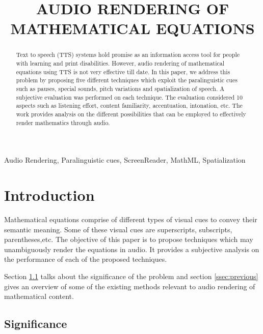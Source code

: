 \documentclass{article}
\title{AUDIO RENDERING OF MATHEMATICAL EQUATIONS}
\begin{document}
%
\maketitle
%
\begin{abstract}

Text to speech (TTS) systems hold promise as an information access tool for people with learning and print disabilities. However, audio rendering of mathematical equations using TTS is not very effective till date. In this paper, we address this problem by proposing five different techniques which exploit the paralinguistic cues such as pauses, special sounds, pitch variations and spatialization of speech. A subjective evaluation was performed on each technique. The evaluation considered 10 aspects such as listening effort, content familiarity, accentuation, intonation, etc. The work provides analysis on the different possibilities that can be employed to effectively render mathematics through audio.


\end{abstract}
%
\begin{keywords}
 Audio Rendering, Paralinguistic cues, ScreenReader, MathML, Spatialization
\end{keywords}
%
\section{Introduction}
\label{sec:intro}
Mathematical equations comprise of different types of visual cues to convey their semantic meaning. Some of these visual cues are superscripts, subscripts, parentheses,etc. The objective of this paper is to propose techniques which may unambiguously render the equations in audio. It provides a subjective analysis on the performance of each of the proposed techniques.


Section \ref{ssec:significance} talks about the significance of the problem and section \ref{ssec:previous} gives an overview of some of the existing methods relevant to audio rendering of mathematical content. 

\subsection{Significance}
\label{ssec:significance}
\end{document}
